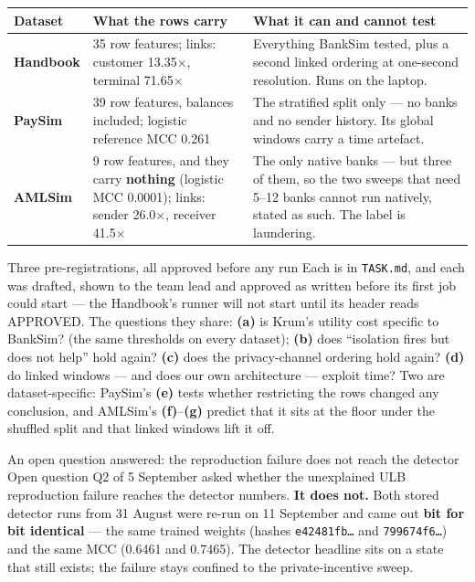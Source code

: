 \documentclass[11pt]{article}
\newcommand{\x}{\ensuremath{\times}}
\begin{document}
\begin{center}\small
\renewcommand{\arraystretch}{1.2}
\begin{tabularx}{\linewidth}{@{}p{2.3cm} p{3.9cm} X@{}}
\toprule
\textbf{Dataset} & \textbf{What the rows carry} & \textbf{What it can and cannot test} \\
\midrule
\textbf{Handbook} & 35 row features; links: customer 13.35\x{}, terminal 71.65\x{} & Everything BankSim tested, plus a second linked ordering at one-second resolution. Runs on the laptop. \\
\textbf{PaySim} & 39 row features, balances included; logistic reference MCC 0.261 & The stratified split only --- no banks and no sender history. Its global windows carry a time artefact. \\
\textbf{AMLSim} & 9 row features, and they carry \textbf{nothing} (logistic MCC 0.0001); links: sender 26.0\x{}, receiver 41.5\x{} & The only native banks --- but three of them, so the two sweeps that need 5--12 banks cannot run natively, stated as such. The label is laundering. \\
\bottomrule
\end{tabularx}
\end{center}

\begin{keybox}{Three pre-registrations, all approved before any run}
Each is in \texttt{TASK.md}, and each was drafted, shown to the team lead and approved as written before
its first job could start --- the Handbook's runner will not start until its header reads APPROVED. The
questions they share: \textbf{(a)} is Krum's utility cost specific to BankSim? (the same thresholds on every
dataset); \textbf{(b)} does ``isolation fires but does not help'' hold again? \textbf{(c)} does the
privacy-channel ordering hold again? \textbf{(d)} do linked windows --- and does our own architecture ---
exploit time? Two are dataset-specific: PaySim's \textbf{(e)} tests whether restricting the rows changed any
conclusion, and AMLSim's \textbf{(f)}--\textbf{(g)} predict that it sits at the floor under the shuffled split
and that linked windows lift it off.
\end{keybox}

\begin{keybox}{An open question answered: the reproduction failure does not reach the detector}
Open question Q2 of 5 September asked whether the unexplained ULB reproduction failure reaches the
detector numbers. \textbf{It does not.} Both stored detector runs from 31 August were re-run on
11 September and came out \textbf{bit for bit identical} --- the same trained weights (hashes
\texttt{e42481fb\ldots} and \texttt{799674f6\ldots}) and the same MCC (0.6461 and 0.7465). The detector
headline sits on a state that still exists; the failure stays confined to the private-incentive sweep.
\end{keybox}
\end{document}
